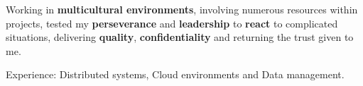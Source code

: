 
Working in \textbf{multicultural environments}, involving numerous
resources within projects, tested my \textbf{perseverance}
and \textbf{leadership} to \textbf{react} to complicated situations,
delivering \textbf{quality}, \textbf{confidentiality} and returning the
trust given to me.

\vspace{1.5em}

\begin{rlist}
  \item Experience: Distributed systems, Cloud environments and Data management.
\end{rlist}
